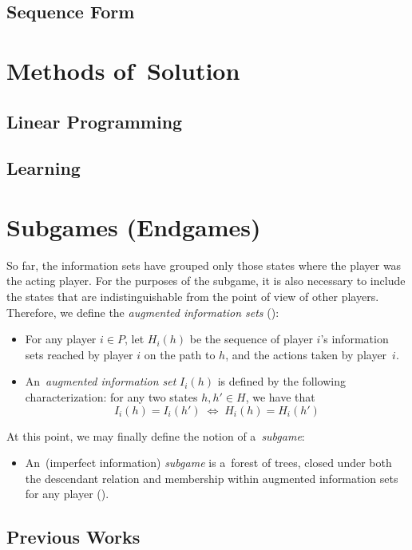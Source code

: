 \subsection{Sequence Form}

\section{Methods of~Solution}

\subsection{Linear Programming}

\subsection{Learning}

\section{Subgames (Endgames)}

So far, the information sets have grouped only those states where the player was the acting player.
For the purposes of the subgame, it is also necessary to include the states that are indistinguishable from the point of view of other players.
Therefore, we define the \emph{augmented information sets} (\cite{BurchJohansonBowling13}):

\begin{itemize}
  \item For any player $i \in P$, let $H_i(h)$ be the sequence of player $i$'s information sets reached by player $i$ on the path to $h$, and the actions taken by player~$i$.
  \item An~\emph{augmented information set} $I_i(h)$ is defined by the following characterization:
    for any two states $h, h' \in H$, we have that 
    \[ I_i (h) = I_i (h') \; \Longleftrightarrow \; H_i (h) = H_i (h') \]
\end{itemize}

At this point, we may finally define the notion of a~\emph{subgame}:

\begin{itemize}
  \item An~(imperfect information) \emph{subgame} is a~forest of trees, closed under both the descendant relation and membership within augmented information sets for any player (\cite{BurchJohansonBowling13}).
\end{itemize}

\subsection{Previous Works}
